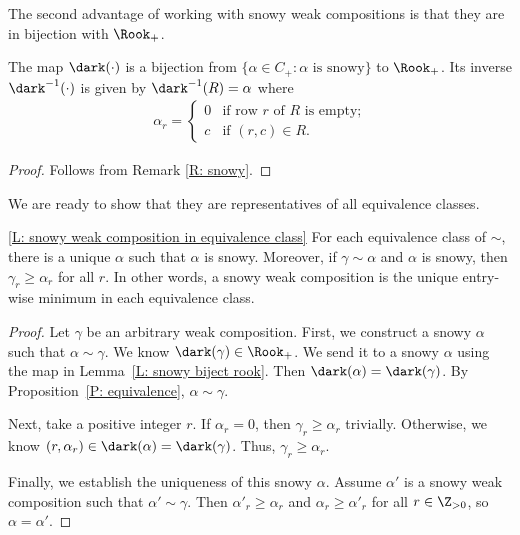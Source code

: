 The second advantage of working with snowy weak compositions is that
they are in bijection with $\Rook_+$.

\begin{lem}
\label{L: snowy biject rook}
The map $\dark(\cdot)$ is a bijection
from $\{ \alpha \in C_+: \alpha \textrm{ is snowy}\}$
to $\Rook_+$.
Its inverse $\dark^{-1}(\cdot)$ 
is given by $\dark^{-1}(R) = \alpha$
where \begin{align*}
\alpha_r =
\begin{cases}
0 &\text{if row $r$ of $R$ is empty;} \\
c &\text{if $(r,c) \in R$.} 
\end{cases}
\end{align*}
\end{lem}
\begin{proof}
Follows from Remark \ref{R: snowy}.
\end{proof}

We are ready to show that they are representatives of all equivalence classes.

\begin{manuallemma}{\ref{L: snowy weak composition in equivalence class}}
For each equivalence class of $\sim$, 
there is a unique $\alpha$ such that $\alpha$ is snowy. 
Moreover, if $\gamma \sim \alpha$ and $\alpha$ is snowy, 
then $\gamma_r \geqslant \alpha_r$ for all $r$.
In other words, a snowy weak composition is the
unique entry-wise minimum in each equivalence class. 
\end{manuallemma}
\begin{proof}
Let $\gamma$ be an arbitrary weak composition. 
First, we construct a snowy $\alpha$ 
such that $\alpha \sim \gamma$.
We know $\dark(\gamma) \in \Rook_+$.
We send it to a snowy $\alpha$
using the map in Lemma~\ref{L: snowy biject rook}.
Then $\dark(\alpha) = \dark(\gamma)$.
By Proposition~\ref{P: equivalence},
$\alpha \sim \gamma$.

Next, take a positive integer $r$.
If $\alpha_r = 0$, then $\gamma_r \geqslant \alpha_r$ trivially.
Otherwise, we know $(r, \alpha_r) \in \dark(\alpha) = \dark(\gamma)$.
Thus, $\gamma_r \geqslant \alpha_r$.

Finally, we establish the uniqueness of this snowy $\alpha$.
Assume $\alpha'$ is a snowy weak composition
such that $\alpha' \sim \gamma$.
Then $\alpha'_r \geqslant \alpha_r$ and $\alpha_r \geqslant \alpha'_r$
for all $r \in \Z_{>0}$, so $\alpha = \alpha'$.
\end{proof}

